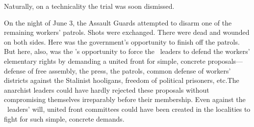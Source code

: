 Naturally, on a technicality the trial was soon dismissed.

\smallskip

On the night of June 3, the Assault Guards attempted to disarm one of the remaining workers’ patrols. Shots were exchanged. There were dead and wounded on both sides. Here was the government’s opportunity to finish off the patrols. But here, also, was the \POUM’s opportunity to force the \CNT\ leaders to defend the workers’ elementary rights by demanding a united front for simple, concrete proposals---defense of free assembly, the press, the patrols, common defense of workers’ districts against the Stalinist hooligans, freedom of political prisoners, etc.\@ The anarchist leaders could have hardly rejected these proposals without compromising themselves irreparably before their membership. Even against the \CNT\ leaders’ will, united front committees could have been created in the localities to fight for such simple, concrete demands.

